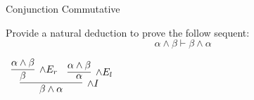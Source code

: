 \documentclass{book}
\begin{document}
    \begin{eg}{Conjunction Commutative}

        Provide a natural deduction to prove the follow sequent: $$ \alpha \land \beta \vdash \beta \land \alpha $$

        \begin{center}
            $\begin{array}{c}
                \infer[\land I]{\beta \land \alpha}
                    {\infer[\land E_{r}]{\beta}
                        {\alpha \land \beta}
                    &
                    \infer[\land E_{l}]{\alpha}
                        {\alpha \land \beta}}
            \end{array}$
        \end{center}
        
    \end{eg}
\end{document}
